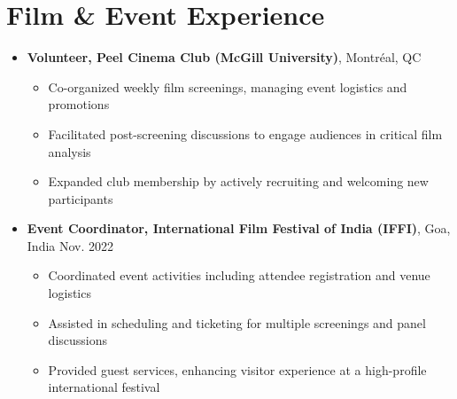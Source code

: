 \documentclass[letterpaper,11pt]{article}
\begin{document}
\section{Film \& Event Experience}
\begin{itemize}[leftmargin=0.15in, label={}]
  \item \textbf{Volunteer, Peel Cinema Club (McGill University)}, Montréal, QC \\
    \vspace{-6pt}
    \begin{itemize}
      \item Co-organized weekly film screenings, managing event logistics and promotions
      \item Facilitated post-screening discussions to engage audiences in critical film analysis
      \item Expanded club membership by actively recruiting and welcoming new participants
    \end{itemize}

  \item \textbf{Event Coordinator, International Film Festival of India (IFFI)}, Goa, India \hfill Nov. 2022 \\
    \vspace{-6pt}
    \begin{itemize}
      \item Coordinated event activities including attendee registration and venue logistics
      \item Assisted in scheduling and ticketing for multiple screenings and panel discussions
      \item Provided guest services, enhancing visitor experience at a high-profile international festival
    \end{itemize}
\end{itemize}

\end{document}
